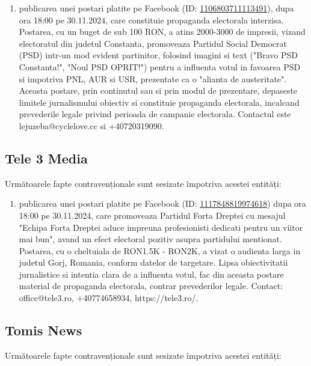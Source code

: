 \documentclass[a4paper,12pt]{article}
\begin{document}
\begin{enumerate}[leftmargin=*, label=\arabic*.)]
    \item publicarea unei postari platite pe Facebook (ID: \href{https://www.facebook.com/ads/library/?id=1106803711113491}{1106803711113491}), dupa ora 18:00 pe 30.11.2024, care constituie propaganda electorala interzisa. Postarea, cu un buget de sub 100 RON, a atins 2000-3000 de impresii, vizand electoratul din judetul Constanta, promoveaza Partidul Social Democrat (PSD) intr-un mod evident partinitor, folosind imagini si text ("Bravo PSD Constanta!", "Noul PSD OPRIT!") pentru a influenta votul in favoarea PSD si impotriva PNL, AUR si USR, prezentate ca o "alianta de austeritate".  Aceasta postare, prin continutul sau si prin modul de prezentare, depaseste limitele jurnalismului obiectiv si constituie propaganda electorala, incalcand prevederile legale privind perioada de campanie electorala.  Contactul este lejuzeba@cyclelove.cc si +40720319090.
\end{enumerate}

\vspace{0.5cm}

\subsection{Tele 3 Media}
Următoarele fapte contravenționale sunt sesizate împotriva acestei entități:

\begin{enumerate}[leftmargin=*, label=\arabic*.)]
    \item publicarea unei postari platite pe Facebook (ID: \href{https://www.facebook.com/ads/library/?id=1117848819974618}{1117848819974618}) dupa ora 18:00 pe 30.11.2024, care promoveaza Partidul Forta Dreptei cu mesajul "Echipa Forta Dreptei aduce impreuna profesionisti dedicati pentru un viitor mai bun", avand un efect electoral pozitiv asupra partidului mentionat. Postarea, cu o cheltuiala de RON1.5K - RON2K, a vizat o audienta larga in judetul Gorj, Romania, conform datelor de targetare.  Lipsa obiectivitatii jurnalistice si intentia clara de a influenta votul, fac din aceasta postare material de propaganda electorala, contrar prevederilor legale.  Contact: office@tele3.ro, +40774658934, https://tele3.ro/.
\end{enumerate}

\vspace{0.5cm}

\subsection{Tomis News}
Următoarele fapte contravenționale sunt sesizate împotriva acestei entități:
\end{document}
